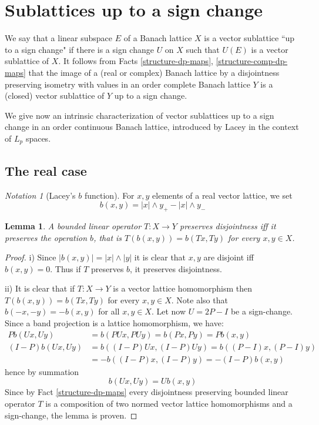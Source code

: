 \documentclass[11pt]{amsart}
\theoremstyle{plain}
\newtheorem{lemma}[theorem]{Lemma}
\theoremstyle{remark}
\newtheorem{notation}[theorem]{Notation}
\begin{document}
\section{Sublattices up to a sign change}\label{section:sublattices-u.s.c.}

We say that a linear subspace $E$ of a Banach lattice $X$ is a vector sublattice ``up to a sign change" if there is a sign change $U$ on $X$ such that $U(E)$ is a vector sublattice of $X$. It follows from Facts \ref{structure-dp-maps},  \ref{structure-comp-dp-maps} that the image of a (real or complex) Banach lattice by a disjointness preserving isometry with values in an  order complete Banach lattice $Y$ is a (closed) vector sublattice of $Y$ up to a sign change. 

We give now an intrinsic characterization of vector sublattices up to a sign change in an order continuous Banach lattice, introduced by Lacey \cite{L} in the context of $L_p$ spaces.

\subsection{The real case}

\begin{notation}[Lacey's $b$ function]\label{Lacey-map}
For $x,y$ elements of a real vector lattice, we set
\[ b(x,y)= |x|\wedge y_+ - |x|\wedge y_-\]
\end{notation}

\begin{lemma}
A bounded linear operator $T:X\to Y$ preserves disjointness iff it preserves the operation $b$, that is  
$T(b(x,y))=b(Tx,Ty)$ for every $x,y\in X$.
\end{lemma}
\begin{proof}
i) Since $|b(x,y)|=|x|\wedge |y|$ it is clear that $x,y$ are disjoint iff $b(x,y)=0$. Thus if $T$ preserves $b$, it preserves disjointness.

\noindent ii) It is clear that if $T:X\to Y$ is a vector lattice homomorphism then $T(b(x,y))=b(Tx,Ty)$ for every $x,y\in X$. Note also that $b(-x,-y)=-b(x,y)$ for all $x,y\in X$. Let now $U=2P-I$ be a sign-change. Since a band projection is a lattice homomorphism, we have:
\begin{align*}
Pb(Ux,Uy)&=b(PU x, PU y)=b(Px,Py)=Pb(x,y)\\
(I-P)b(Ux,Uy)&=b((I-P)Ux,(I-P)Uy)=b((P-I)x,(P-I)y)\\
&=-b((I-P)x,(I-P)y)=-(I-P)b(x,y)
\end{align*}
hence by summation
\[b(Ux,Uy)= Ub(x,y)\]
Since by Fact \ref{structure-dp-maps} every  disjointness preserving bounded linear operator $T$ is a composition of two normed vector lattice homomorphisms and  a sign-change, the lemma is proven.
\end{proof}
\end{document}
